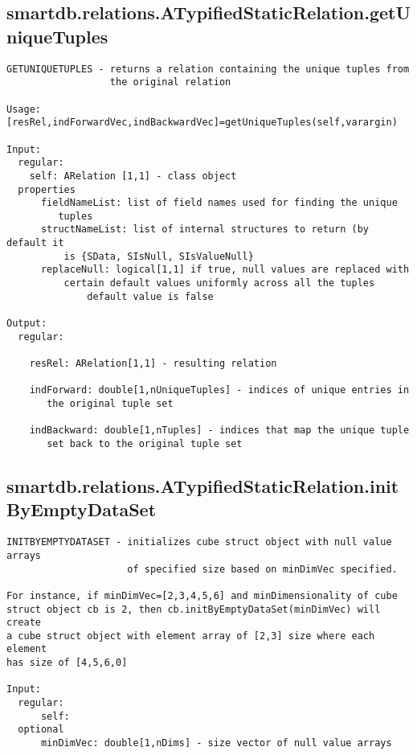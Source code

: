 \subsection{\texorpdfstring{smartdb.relations.ATypifiedStaticRelation.getUniqueTuples}{getUniqueTuples}}\label{method:smartdb.relations.ATypifiedStaticRelation.getUniqueTuples}
\begin{verbatim}
GETUNIQUETUPLES - returns a relation containing the unique tuples from
                  the original relation

Usage: [resRel,indForwardVec,indBackwardVec]=getUniqueTuples(self,varargin)

Input:
  regular:
    self: ARelation [1,1] - class object
  properties
      fieldNameList: list of field names used for finding the unique
         tuples
      structNameList: list of internal structures to return (by default it
          is {SData, SIsNull, SIsValueNull}
      replaceNull: logical[1,1] if true, null values are replaced with
          certain default values uniformly across all the tuples
              default value is false

Output:
  regular:

    resRel: ARelation[1,1] - resulting relation

    indForward: double[1,nUniqueTuples] - indices of unique entries in
       the original tuple set

    indBackward: double[1,nTuples] - indices that map the unique tuple
       set back to the original tuple set
\end{verbatim}
\subsection{\texorpdfstring{smartdb.relations.ATypifiedStaticRelation.initByEmptyDataSet}{initByEmptyDataSet}}\label{method:smartdb.relations.ATypifiedStaticRelation.initByEmptyDataSet}
\begin{verbatim}
INITBYEMPTYDATASET - initializes cube struct object with null value arrays
                     of specified size based on minDimVec specified.

For instance, if minDimVec=[2,3,4,5,6] and minDimensionality of cube
struct object cb is 2, then cb.initByEmptyDataSet(minDimVec) will create
a cube struct object with element array of [2,3] size where each element
has size of [4,5,6,0]

Input:
  regular:
      self:
  optional
      minDimVec: double[1,nDims] - size vector of null value arrays
\end{verbatim}
